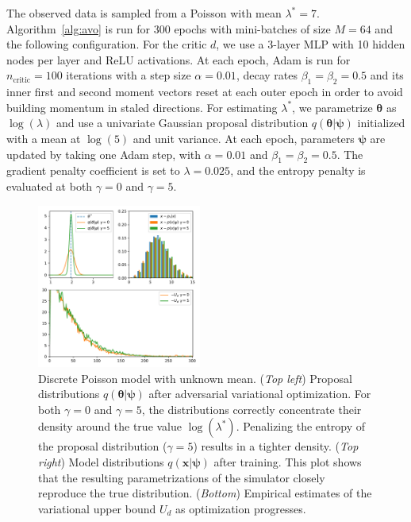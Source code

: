 \documentclass[twocolumn,superscriptaddress,aps]{revtex4-1}
\newcommand{\qxpsi}{q(\mathbf{x}|\bfpsi)}
\newcommand{\bftheta}{{\bm \theta}}
\newcommand{\bfpsi}{{\bm \psi}}
\theoremstyle{plain}
\begin{document}
The observed data is sampled from a Poisson with mean $\lambda^* = 7$.
Algorithm~\ref{alg:avo} is run for 300 epochs with mini-batches of size $M=64$
and the following configuration. For the critic $d$, we use a 3-layer MLP with 10
hidden nodes per layer and ReLU activations. At each epoch, Adam is run for
$n_\text{critic}=100$ iterations with a step size $\alpha=0.01$, decay rates
$\beta_1=\beta_2=0.5$ and its inner first and second moment vectors reset at
each outer epoch in order to avoid building momentum in staled directions.  For
estimating $\lambda^*$, we parametrize $\bftheta$ as $\log(\lambda)$ and use a univariate Gaussian proposal distribution
$q(\bftheta|\bfpsi)$ initialized with a mean at $\log(5)$ and unit variance. At
each epoch, parameters $\bfpsi$ are updated by taking one Adam step, with
$\alpha=0.01$ and $\beta_1=\beta_2=0.5$. The gradient penalty coefficient is set to
$\lambda=0.025$, and the entropy penalty is evaluated at both $\gamma=0$ and $\gamma=5$.

\begin{figure}
    \centering
    \includegraphics[width=0.48\textwidth]{figures/poisson.pdf}
    \caption{Discrete Poisson model with unknown mean.
             ({\it Top left}) Proposal distributions $q(\bftheta|\bfpsi)$ after adversarial variational optimization. For both $\gamma=0$ and $\gamma=5$, the distributions correctly concentrate their density around
                        the true value $\log(\lambda^*)$. Penalizing the entropy of the proposal distribution ($\gamma=5$) results in a tighter density.
             ({\it Top right}) Model distributions $\qxpsi$ after training. This plot shows that the resulting parametrizations of the simulator closely reproduce the true distribution.
             ({\it Bottom}) Empirical estimates of the variational upper bound $U_d$ as optimization progresses.
             }\label{fig:poisson}
\end{figure}
\end{document}

